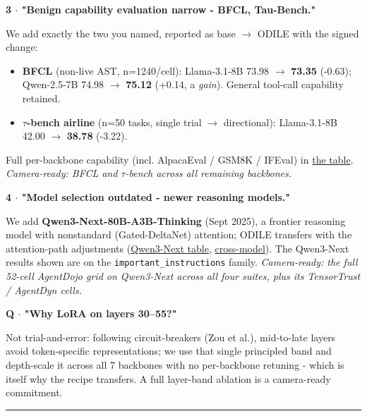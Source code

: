 \documentclass[11pt]{article}
\begin{document}
\textbf{3 $\cdot$ "Benign capability evaluation narrow - BFCL, Tau-Bench."}\par
We add exactly the two you named, reported as base $\rightarrow$ ODILE with the signed change:\par
\begin{itemize}
\item \textbf{BFCL} (non-live AST, n=1240/cell): Llama-3.1-8B 73.98 $\rightarrow$ \textbf{73.35} (-0.63); Qwen-2.5-7B 74.98 $\rightarrow$ \textbf{75.12} (+0.14, a \emph{gain}). General tool-call capability retained.
\item \textbf{$\tau$-bench airline} (n=50 tasks, single trial $\rightarrow$ directional): Llama-3.1-8B 42.00 $\rightarrow$ \textbf{38.78} (-3.22).
\end{itemize}

Full per-backbone capability (incl. AlpacaEval / GSM8K / IFEval) in \href{https://github.com/memo-ozdincer/odile-rebuttal-exhibits/blob/main/tab\_capability.pdf}{\textcolor{linkblue}{the table}}. \emph{Camera-ready: BFCL and $\tau$-bench across all remaining backbones.}\par

\textbf{4 $\cdot$ "Model selection outdated - newer reasoning models."}\par
We add \textbf{Qwen3-Next-80B-A3B-Thinking} (Sept 2025), a frontier reasoning model with nonstandard (Gated-DeltaNet) attention; ODILE transfers with the attention-path adjustments (\href{https://github.com/memo-ozdincer/odile-rebuttal-exhibits/blob/main/tab\_pareto\_qnext.pdf}{\textcolor{linkblue}{Qwen3-Next table}}, \href{https://github.com/memo-ozdincer/odile-rebuttal-exhibits/blob/main/T2\_crossmodel\_AD.pdf}{\textcolor{linkblue}{cross-model}}). The Qwen3-Next results shown are on the \texttt{important\_instructions} family. \emph{Camera-ready: the full 52-cell AgentDojo grid on Qwen3-Next across all four suites, plus its TensorTrust / AgentDyn cells.}\par

\textbf{Q $\cdot$ "Why LoRA on layers 30--55?"}\par
Not trial-and-error: following circuit-breakers (Zou et al.), mid-to-late layers avoid token-specific representations; we use that single principled band and depth-scale it across all 7 backbones with no per-backbone retuning - which is itself why the recipe transfers. A full layer-band ablation is a camera-ready commitment.\par

\vspace{2pt}\hrule\vspace{4pt}
\end{document}
